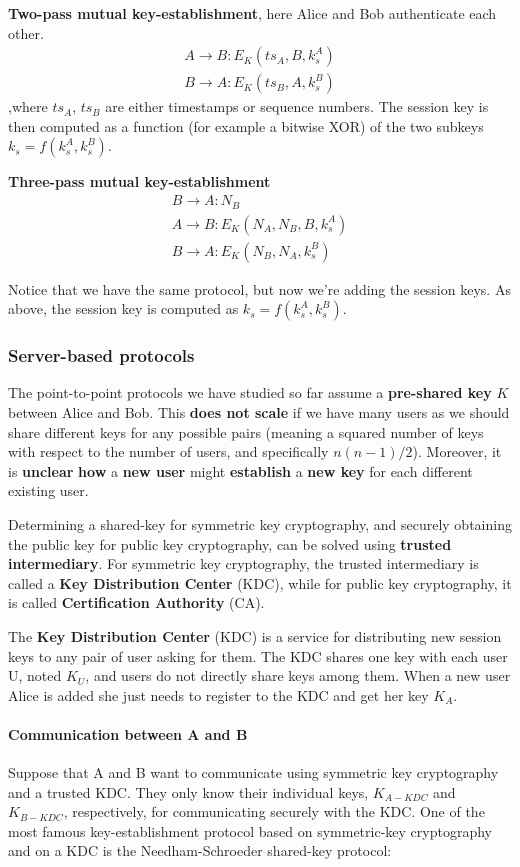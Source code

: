 \textbf{Two-pass mutual key-establishment}, here Alice and Bob authenticate each other.
$$\begin{array}{l} A \rightarrow B: E_K(ts_A,B,k_s^A)\\B \rightarrow A: E_K(ts_B,A,k_s^B) \end{array}$$
,where $ts_A$, $ts_B$ are either timestamps or sequence numbers. The session key is then computed as a function (for example a bitwise XOR) of the two subkeys $k_s = f(k_s^A,k_s^B)$.

\textbf{Three-pass mutual key-establishment}
$$\begin{array}{l} B \rightarrow A: N_B\\A \rightarrow B: E_K(N_A,N_B,B,k_s^A)\\ B \rightarrow A: E_K(N_B,N_A,k_s^B)\end{array}$$

Notice that we have the same protocol, but now we're adding the session keys. As above, the session key is computed as $k_s = f(k_s^A,k_s^B)$.

\subsubsection{Server-based protocols}
The point-to-point protocols we have studied so far assume a \textbf{pre-shared key} $K$ between Alice and Bob. This \textbf{does not scale} if we have many users as we should share different keys for any possible pairs (meaning a squared number of keys with respect to the number of users, and specifically $n(n-1)/2$). Moreover, it is \textbf{unclear} \textbf{how} a \textbf{new user} might \textbf{establish} a \textbf{new key} for each different existing user.

Determining a shared-key for symmetric key cryptography, and securely obtaining the public key for public key cryptography, can be solved using \textbf{trusted intermediary}. For symmetric key cryptography, the trusted intermediary is called a \textbf{Key Distribution Center} (KDC), while for public key cryptography, it is called \textbf{Certification Authority} (CA).

The \textbf{Key Distribution Center} (KDC) is a service for distributing new session keys to any pair of user asking for them. The KDC shares one key with each user U, noted $K_U$, and users do not directly share keys among them. When a new user Alice is added she just needs to register to the KDC and get her key $K_A$.

\paragraph{Communication between A and B}
Suppose that A and B want to communicate using symmetric key cryptography and a trusted KDC. They only know their individual keys, $K_{A-KDC}$ and $K_{B-KDC}$, respectively, for communicating securely with the KDC. One of the most famous key-establishment protocol based on symmetric-key cryptography and on a KDC is the Needham-Schroeder shared-key protocol:

